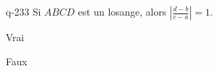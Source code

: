 \begin{truefalse}{q-233}
Si $ABCD$ est un losange, alors $\left|\frac{d-b}{c-a}\right|=1$.
\item Vrai
\item* Faux
\end{truefalse}

